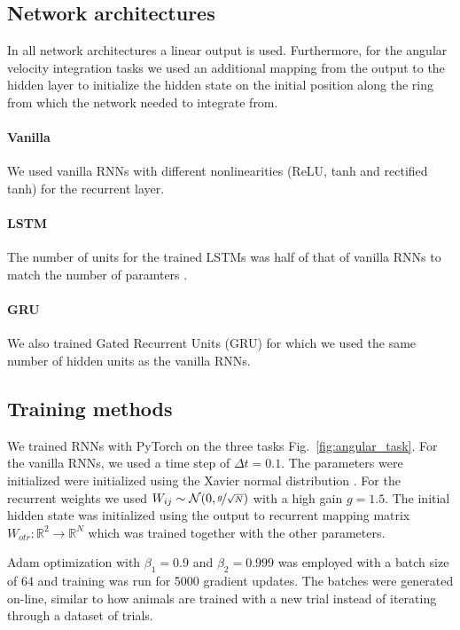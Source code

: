 \documentclass{article} %
\newcounter{ct}
\newcommand{\reals}{\mathbb{R}}
\theoremstyle{definition}
\theoremstyle{remark}
\begin{document}
\subsection{Network architectures}
In all network architectures a linear output is used.
Furthermore, for the angular velocity integration tasks we used an additional mapping from the output to the hidden layer to initialize the hidden state on the initial position along the ring from which the network needed to integrate from.

\paragraph{Vanilla}
We used vanilla RNNs with different nonlinearities (ReLU, tanh and rectified tanh) for the recurrent layer.


\paragraph{LSTM}
The number of units for the trained LSTMs was half of that of vanilla RNNs to match the number of paramters \citep{Hochreiter1997}.


\paragraph{GRU}
We also trained Gated Recurrent Units (GRU) \citep{cho2014learning} for which we used the same number of hidden units as the vanilla RNNs.




\subsection{Training methods}
We trained  RNNs with PyTorch \citep{paszke2017automatic}  on the three tasks Fig.~\ref{fig:angular_task}.
For the vanilla RNNs, we used a time step of \(\Delta t = 0.1\).
The parameters were initialized were initialized using the Xavier normal distribution \citep{Glorot2010}.
For the recurrent weights we used \(W_{ij}\sim\mathcal{N}(0, \nicefrac{g}{\sqrt{N}})\) with a high gain \(g = 1.5\).
The initial hidden state was initialized using the output to recurrent mapping matrix \(W_{otr}\colon\reals^{2}\rightarrow\reals^{N}\) which was trained together with the other parameters.

Adam optimization with \(\beta_{1} = 0.9\) and \(\beta_{2} = 0.999\) was employed with a batch size of 64 and training was run for 5000 gradient updates.
The batches were generated on-line, similar to how animals are trained with a new trial instead of iterating through a dataset of trials.
\end{document}
